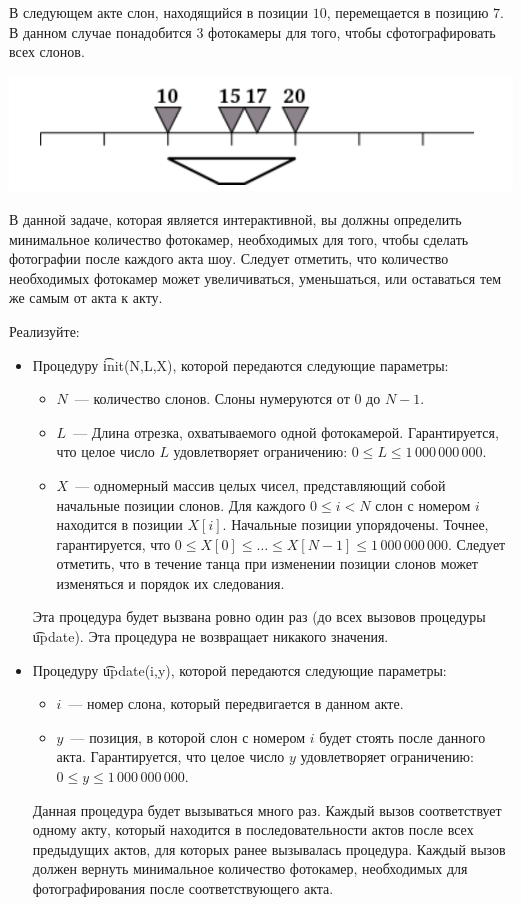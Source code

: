 В следующем акте слон, находящийся в позиции $10$, перемещается в позицию $7$. В данном случае понадобится 3 фотокамеры для того, чтобы сфотографировать всех слонов.

\includegraphics{elephants3.png}

В данной задаче, которая является интерактивной, вы должны определить минимальное количество фотокамер, необходимых для того, чтобы сделать фотографии после каждого акта шоу. Следует отметить, что количество необходимых фотокамер может увеличиваться, уменьшаться, или оставаться тем же самым от акта к акту.


Реализуйте:
\begin{itemize}

\item Процедуру \t{init(N,L,X)}, которой передаются следующие параметры:
\begin{itemize}
\item $N$~--- количество слонов. Слоны нумеруются от $0$ до $N-1$.

\item $L$~--- Длина отрезка, охватываемого одной фотокамерой. Гарантируется, что целое число $L$ удовлетворяет ограничению: $0 \le L \le 1\,000\,000\,000$.

\item $X$~--- одномерный массив целых чисел, представляющий собой начальные позиции слонов. Для каждого $0 \le i < N$ слон с номером $i$ находится в позиции $X[i]$. Начальные позиции упорядочены. Точнее, гарантируется, что $0 \le X[0] \le \dots \le X[N-1] \le 1\,000\,000\,000$. Следует отметить, что в течение танца при изменении позиции слонов может изменяться и порядок их следования.

\end{itemize}

Эта процедура будет вызвана ровно один раз (до всех вызовов процедуры \t{update}). Эта процедура не возвращает никакого значения.
\item Процедуру \t{update(i,y)}, которой передаются следующие параметры:
\begin{itemize}
\item $i$~--- номер слона, который передвигается в данном акте.
\item $y$~--- позиция, в которой слон с номером $i$ будет стоять после данного акта. Гарантируется, что целое число $y$ удовлетворяет ограничению: $0 \le y \le 1\,000\,000\,000$.
\end{itemize}
Данная процедура будет вызываться много раз. Каждый вызов соответствует одному акту, который находится в последовательности актов после всех предыдущих актов, для которых ранее вызывалась процедура. Каждый вызов должен вернуть минимальное количество фотокамер, необходимых для фотографирования после соответствующего акта.
\end{itemize}


